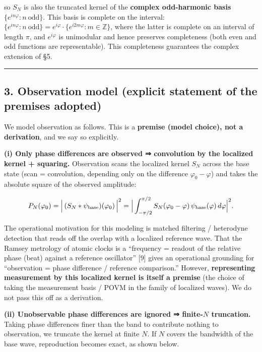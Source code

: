 \documentclass[
]{ltjsarticle}
\begin{document}
so \(S_N\) is also the truncated kernel of the \textbf{complex
odd-harmonic basis} \(\{e^{in\varphi}:n\ \text{odd}\}\). This basis is
complete on the interval:
\(\{e^{in\varphi}:n\ \text{odd}\}=e^{i\varphi}\cdot\{e^{i2m\varphi}:m\in\mathbb Z\}\),
where the latter is complete on an interval of length \(\pi\), and
\(e^{i\varphi}\) is unimodular and hence preserves completeness (both
even and odd functions are representable). This completeness guarantees
the complex extension of §5.

\begin{center}\rule{0.5\linewidth}{0.5pt}\end{center}

\subsection{3. Observation model (explicit statement of the premises
adopted)}\label{observation-model-explicit-statement-of-the-premises-adopted}

We model observation as follows. This is a \textbf{premise (model
choice), not a derivation}, and we say so explicitly.

\textbf{(i) Only phase differences are observed ⇒ convolution by the
localized kernel + squaring.} Observation scans the localized kernel
\(S_N\) across the base state (scan = convolution, depending only on the
difference \(\varphi_0-\varphi\)) and takes the absolute square of the
observed amplitude:

\[
P_N(\varphi_0)=\Big|\,(S_N*\psi_{\rm base})(\varphi_0)\,\Big|^2
=\Big|\int_{-\pi/2}^{\pi/2}S_N(\varphi_0-\varphi)\,\psi_{\rm base}(\varphi)\,d\varphi\Big|^2 .
\]

The operational motivation for this modeling is matched filtering /
heterodyne detection that reads off the overlap with a localized
reference wave. That the Ramsey metrology of atomic clocks is a
``frequency = readout of the relative phase (beat) against a reference
oscillator'' {[}9{]} gives an operational grounding for ``observation =
phase difference / reference comparison.'' However, \textbf{representing
measurement by this localized kernel is itself a premise} (the choice of
taking the measurement basis / POVM in the family of localized waves).
We do not pass this off as a derivation.

\textbf{(ii) Unobservable phase differences are ignored ⇒ finite-\(N\)
truncation.} Taking phase differences finer than the band to contribute
nothing to observation, we truncate the kernel at finite \(N\). If \(N\)
covers the bandwidth of the base wave, reproduction becomes exact, as
shown below.
\end{document}
